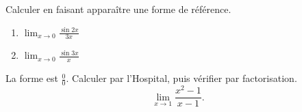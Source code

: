 \documentclass[11pt,a4paper]{article}
\begin{document}
\begin{exercice}
Calculer en faisant apparaître une forme de référence.
\begin{enumerate}[label=\alph*),leftmargin=2em,itemsep=3pt]
  \item $\displaystyle\lim_{x\to 0}\frac{\sin 2x}{3x}$
  \item $\displaystyle\lim_{x\to 0}\frac{\sin 3x}{x}$
\end{enumerate}
\end{exercice}

\begin{exercice}
La forme est $\frac00$. Calculer par l'Hospital, puis vérifier par factorisation.
\[ \lim_{x\to 1}\frac{x^2-1}{x-1}. \]
\end{exercice}
\end{document}
